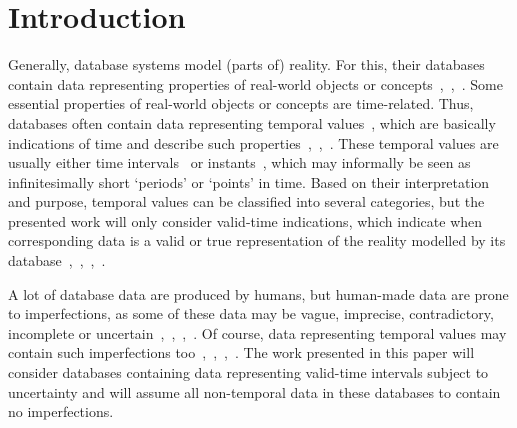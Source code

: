 \documentclass[runningheads,a4paper]{llncs}
\begin{document}
\section{Introduction}
Generally, database systems model (parts of) reality. For this, their databases contain data representing properties of real-world objects or concepts~\cite{Pons2012ijcis},~\cite{Billiet2012ipmu},~\cite{Pons2012ipmu}. Some essential properties of real-world objects or concepts are time-related. Thus, databases often contain data representing temporal values~\cite{Bohlen1998lncs}, which are basically indications of time and describe such properties~\cite{Pons2012ijcis},~\cite{Jensen1999ieeetkde},~\cite{Galindo2001}. These temporal values are usually either time intervals~\cite{Bohlen1998lncs} or instants~\cite{Bohlen1998lncs}, which may informally be seen as infinitesimally short `periods' or `points' in time. Based on their interpretation and purpose, temporal values can be classified into several categories, but the presented work will only consider valid-time indications, which indicate when corresponding data is a valid or true representation of the reality modelled by its database~\cite{Bohlen1998lncs},~\cite{Pons2012ijcis},~\cite{Billiet2012ipmu},~\cite{Pons2012ipmu}.

A lot of database data are produced by humans, but human-made data are prone to imperfections, as some of these data may be vague, imprecise, contradictory, incomplete or uncertain~\cite{Billiet2012ipmu},~\cite{Pons2012ipmu},~\cite{Medina1994is},~\cite{Bosc2010ijufkbs}. Of course, data representing temporal values may contain such imperfections too~\cite{Billiet2012ipmu},~\cite{Pons2012ipmu},~\cite{Pons2012ijcis},~\cite{Dyreson1998acm}. The work presented in this paper will consider databases containing data representing valid-time intervals subject to uncertainty and will assume all non-temporal data in these databases to contain no imperfections.
\end{document}
